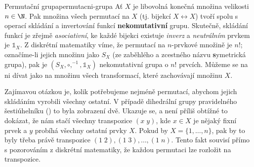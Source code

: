 \begin{example}{Permutační grupa}{permutacni-grupa}
 Ať $X$ je libovolná konečná množina velikosti $n \in \N$. Pak množina všech
 permutací na $X$ (tj. bijekcí $X \leftrightarrow X$) tvoří spolu s operací
 skládání a invertování funkcí \textbf{nekomutativní} grupu. Skutečně, skládání
 funkcí je zřejmě \emph{asociativní}, ke každé bijekci existuje \emph{inverz} a
 \emph{neutrálním} prvkem je $\mathds{1}_{X}$. Z diskrétní matematiky víme, že
 permutací na $n$-prvkové množině je $n!$; označíme-li jejich množinu jako $S_X$
 (ze zaběhlého a zcestného názvu \textbf{s}ymetrická grupa), pak je $(S_X,
 \circ,^{-1},\mathds{1}_{X})$ nekomutativní grupa o $n!$ prvcích. Můžeme se na
 ni dívat jako na množinu všech transformací, které zachovávají množinu $X$.

 Zajímavou otázkou je, kolik potřebujeme nejméně permutací, abychom jejich
 skládáním vyrobili všechny ostatní. V případě dihedrální grupy pravidelného
 šestiúhelníku () to byla zobrazení dvě.
 Ukazuje se, a není příliš obtížné to dokázat, že nám stačí všechny transpozice
 $(x \; y)$, kde $x \in X$ je nějaký fixní prvek a $y$ probíhá všechny ostatní
 prvky $X$. Pokud by $X = \{1,\ldots,n\}$, pak by to byly třeba právě
 transpozice $(1 \; 2), (1 \; 3),\ldots,(1 \; n)$. Tento fakt souvisí přímo s
 pozorováním z diskrétní matematiky, že každou permutaci lze rozložit na
 transpozice. 
\end{example}

